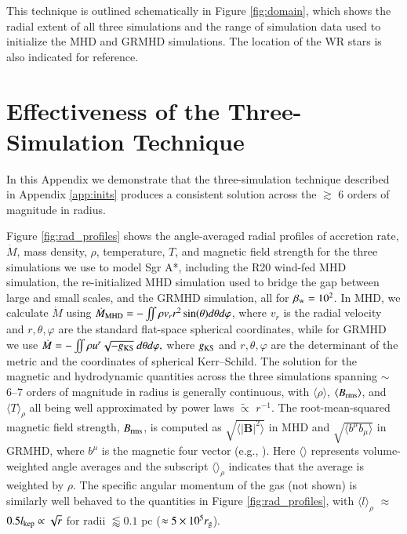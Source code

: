 \documentclass[twocolumn,twocolappendix,apjl,appendixfloats]{aastex63}
\begin{document}
This technique is outlined schematically in Figure \ref{fig:domain}, which shows the radial extent of all three simulations and the range of simulation data used to initialize the MHD and GRMHD simulations.   The location of the WR stars is also indicated for reference.



\section{Effectiveness of the Three-Simulation Technique}
\label{app:3_sim_results}
In this Appendix we demonstrate that the three-simulation technique described in Appendix \ref{app:inits} produces a consistent solution across the $\gtrsim$ 6 orders of magnitude in radius.

Figure \ref{fig:rad_profiles} shows the angle-averaged radial profiles of accretion rate, $\dot M$, mass density, $\rho$, temperature, $T$, and magnetic field strength for the three simulations we use to model Sgr A*, including the R20 wind-fed MHD simulation, the re-initialized MHD simulation used to bridge the gap between large and small scales, and the GRMHD simulation, all for $\beta_{\rm w} = 10^2$.  In MHD, we calculate $\dot M$ using $\dot M_{\rm MHD} = -\iint \rho v_r r^2 \sin(\theta) d\theta d\varphi$, where $v_r$ is the radial velocity and $r,\theta,\varphi$ are the standard flat-space spherical coordinates, while for GRMHD we use $\dot M =  -\iint \rho u^r \sqrt{-g_{\rm KS}} \textrm{ }d\theta d\varphi,$ where $g_{\rm KS}$ and $r,\theta,\varphi$ are the determinant of the metric and the coordinates of spherical Kerr--Schild. The solution for the magnetic and hydrodynamic quantities across the three simulations spanning $\sim$ 6--7 orders of magnitude in radius is generally continuous, with $\langle \rho \rangle$, $\langle B_{\rm rms}\rangle$, and $\langle T\rangle_\rho$ all being well approximated by power laws $\tilde\propto$ $r^{-1}$.  The root-mean-squared magnetic field strength, $B_{\rm rms}$, is computed as $\sqrt{\langle |\mathbf{B}|^2\rangle}$ in MHD and $\sqrt{\langle b^\mu b_\mu\rangle}$ in GRMHD, where $b^\mu$ is the magnetic four vector (e.g., \citealt{Gammie2003}). Here $\langle \rangle$ represents volume-weighted angle averages and the subscript $\langle\rangle_\rho$ indicates that the average is weighted by $\rho$.   The specific angular momentum of the gas (not shown) is similarly well behaved to the quantities in Figure \ref{fig:rad_profiles}, with $\langle l \rangle_\rho$ $\approx$ $0.5 l_{\rm kep} \propto \sqrt{r}$ for radii $\lessapprox 0.1$ pc ($\approx 5 \times 10^5 r_{\rm g} $).   
\end{document}
